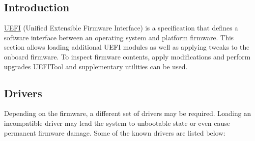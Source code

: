 \documentclass[]{article}
\begin{document}
\subsection{Introduction}\label{uefiintro}

\href{https://uefi.org/specifications}{UEFI} (Unified Extensible Firmware Interface)
is a specification that defines a software interface between an operating system and
platform firmware. This section allows loading additional UEFI modules as well as applying
tweaks to the onboard firmware. To inspect firmware contents, apply modifications
and perform upgrades \href{https://github.com/LongSoft/UEFITool/releases}{UEFITool}
and supplementary utilities can be used.

\subsection{Drivers}\label{uefidrivers}

Depending on the firmware, a different set of drivers may be required.
Loading an incompatible driver may lead the system to unbootable state or
even cause permanent firmware damage. Some of the known drivers are listed below:
\end{document}
